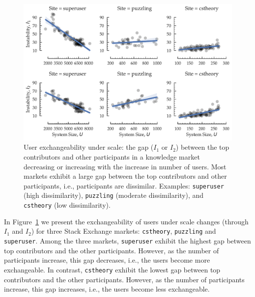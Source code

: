\begin{figure}[hbt]
\vspace{-0.5\baselineskip}
\centering
\includegraphics[scale=0.39]{Figures/Size_vs_Instability.pdf}
\vspace{-2\baselineskip}
\caption{User exchangeability under scale: the gap ($I_1$ or $I_2$) between the top contributors and other participants in a knowledge market decreasing or increasing with the increase in number of users. Most markets exhibit a large gap between the top contributors and other participants, i.e., participants are dissimilar. Examples: \texttt{superuser} (high dissimilarity), \texttt{puzzling} (moderate dissimilarity), and \texttt{cstheory} (low dissimilarity).}
\vspace{-\baselineskip}
\label{fig:stability}
\end{figure}

In Figure~\ref{fig:stability} we present the exchangeability of users under scale changes (through $I_1$ and $I_2$) for three Stack Exchange markets: \texttt{cstheory}, \texttt{puzzling} and \texttt{superuser}. Among the three markets, \texttt{superuser} exhibit the highest gap between top contributors and the other participants. However, as the number of participants increase, this gap decreases, i.e., the users become more exchangeable. In contrast, \texttt{cstheory} exhibit the lowest gap between top contributors and the other participants. However, as the number of participants increase, this gap increases, i.e., the users become less exchangeable.

